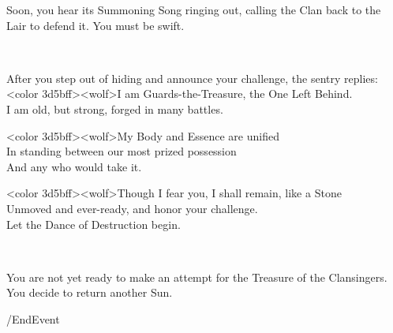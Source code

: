 Soon, you hear its Summoning Song ringing out, calling the Clan back to the Lair
to defend it. You must be swift.

\\ %

 


After you step out of hiding and announce your challenge, the sentry replies:\\
<color 3d5bff><wolf>I am Guards-the-Treasure, the One Left Behind.\\
I am old, but strong, forged in many battles.

<color 3d5bff><wolf>My Body and Essence are unified\\
In standing between our most prized possession\\
And any who would take it.

<color 3d5bff><wolf>Though I fear you, I shall remain, like a Stone\\
Unmoved and ever-ready, and honor your challenge.\\
Let the Dance of Destruction begin.

\\ %

 
  


You are not yet ready to make an attempt for the Treasure of the Clansingers.
You decide to return another Sun.

\option /EndEvent 
  

